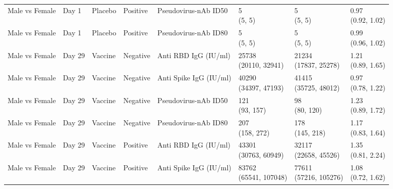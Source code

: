 \documentclass[]{book}
\theoremstyle{definition}
\theoremstyle{definition}
\theoremstyle{definition}
\newcommand{\1}{\mathbbm{1}}
\begin{document}
\begin{landscape}
\begin{ThreePartTable}
\begin{longtable}[t]{>{\raggedright\arraybackslash}p{2.7cm}lllllll}
Male vs Female & Day 1 & Placebo & Positive & Pseudovirus-nAb ID50 & \makecell[l]{5\\(5, 5)} & \makecell[l]{5\\(5, 5)} & \makecell[l]{0.97\\(0.92, 1.02)}\\
Male vs Female & Day 1 & Placebo & Positive & Pseudovirus-nAb ID80 & \makecell[l]{5\\(5, 5)} & \makecell[l]{5\\(5, 5)} & \makecell[l]{0.99\\(0.96, 1.02)}\\
Male vs Female & Day 29 & Vaccine & Negative & Anti RBD IgG (IU/ml) & \makecell[l]{25738\\(20110, 32941)} & \makecell[l]{21234\\(17837, 25278)} & \makecell[l]{1.21\\(0.89, 1.65)}\\
Male vs Female & Day 29 & Vaccine & Negative & Anti Spike IgG (IU/ml) & \makecell[l]{40290\\(34397, 47193)} & \makecell[l]{41415\\(35725, 48012)} & \makecell[l]{0.97\\(0.78, 1.22)}\\
\addlinespace
Male vs Female & Day 29 & Vaccine & Negative & Pseudovirus-nAb ID50 & \makecell[l]{121\\(93, 157)} & \makecell[l]{98\\(80, 120)} & \makecell[l]{1.23\\(0.89, 1.72)}\\
Male vs Female & Day 29 & Vaccine & Negative & Pseudovirus-nAb ID80 & \makecell[l]{207\\(158, 272)} & \makecell[l]{178\\(145, 218)} & \makecell[l]{1.17\\(0.83, 1.64)}\\
Male vs Female & Day 29 & Vaccine & Positive & Anti RBD IgG (IU/ml) & \makecell[l]{43301\\(30763, 60949)} & \makecell[l]{32117\\(22658, 45526)} & \makecell[l]{1.35\\(0.81, 2.24)}\\
Male vs Female & Day 29 & Vaccine & Positive & Anti Spike IgG (IU/ml) & \makecell[l]{83762\\(65541, 107048)} & \makecell[l]{77611\\(57216, 105276)} & \makecell[l]{1.08\\(0.72, 1.62)}\\

\end{longtable}
\end{ThreePartTable}
\end{landscape}
\end{document}
